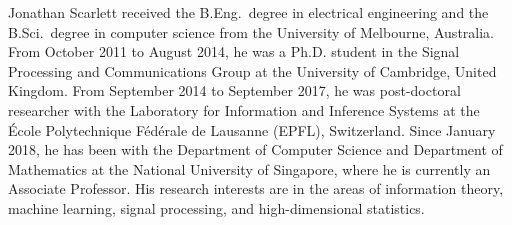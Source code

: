 \documentclass[journal]{IEEEtran}
\theoremstyle{definition}
\theoremstyle{definition}
\begin{document}
\begin{IEEEbiographynophoto}{Jonathan Scarlett}
 received the B.Eng.~degree in electrical engineering and the B.Sci.~degree in  computer science from the University of Melbourne, Australia. From October 2011 to August 2014, he was a Ph.D. student in the Signal Processing and Communications Group at the University of Cambridge, United Kingdom. From September 2014 to September 2017, he was post-doctoral researcher with the Laboratory for Information and Inference Systems at the \'Ecole Polytechnique F\'ed\'erale de Lausanne (EPFL), Switzerland. Since January 2018, he has been with the Department of Computer Science and Department of Mathematics at the National University of Singapore, where he is currently an Associate Professor. His research interests are in the areas of information theory, machine learning, signal processing, and high-dimensional statistics.
\end{IEEEbiographynophoto}
\end{document}
